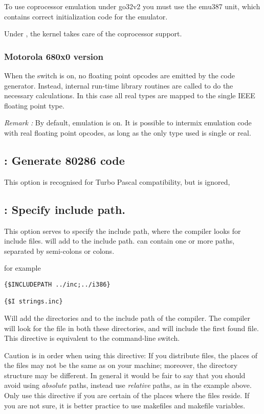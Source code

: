 \documentclass{report}
\begin{document}
To use coprocessor emulation under \dos go32v2 you must use the
emu387 unit, which contains correct initialization code for the
emulator.

Under \linux, the kernel takes care of the coprocessor support.

\subsubsection{ Motorola 680x0 version }

When the switch is on, no floating point opcodes are emitted
by the code generator. Instead, internal run-time library routines
are called to do the necessary calculations. In this case all
real types are mapped to the single IEEE floating point type.

\emph{ Remark : } By default, emulation is on. It is possible to
intermix emulation code with real floating point opcodes, as
long as the only type used is single or real.

\subsection{ : Generate 80286 code}

This option is recognised for Turbo Pascal compatibility, but is ignored,

\subsection{ : Specify include path.}

This option serves to specify the include path, where the compiler looks for
include files.  will add  to the include
path.  can contain one or more paths, separated by semi-colons or
colons.

for example
\begin{verbatim}
{$INCLUDEPATH ../inc;../i386}

{$I strings.inc}
\end{verbatim}

Will add the directories  and  to the include
path of the compiler. The compiler will look for the file 
in both these directories, and will include the first found file. This directive is 
equivalent to the  command-line switch.

Caution is in order when using this directive: If you distribute files, the 
places of the files may not be the same as on your machine; moreover, the
directory structure may be different. In general it would be fair to say
that you should avoid using {\em absolute} paths, instead use {\em relative}
paths, as in the example above. Only use this directive if you are certain
of the places where the files reside. If you are not sure, it is better
practice to use makefiles and makefile variables.
 
\end{document}
